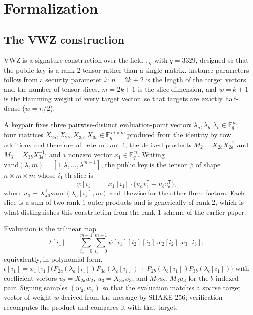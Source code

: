\section{Formalization}
\label{sec:formalization}

\subsection{The VWZ construction}

VWZ is a signature construction over the field $\mathbb{F}_q$ with $q = 3329$,
designed so that the public key is a rank-2 tensor rather than a single matrix.
Instance parameters follow from a security parameter $k$: $n = 2k+2$ is the
length of the target vectors and the number of tensor slices, $m = 2k+1$ is the
slice dimension, and $w = k+1$ is the Hamming weight of every target vector, so
that targets are exactly half-dense ($w = n/2$).

A keypair fixes three pairwise-distinct evaluation-point vectors
$\lambda_a, \lambda_b, \lambda_c \in \mathbb{F}_q^{\,n}$; four matrices
$X_{2a}, X_{2b}, X_{3a}, X_{3b} \in \mathbb{F}_q^{\,m \times m}$ produced from the
identity by row additions and therefore of determinant $1$; the derived products
$M_2 = X_{2b} X_{2a}^{-1}$ and $M_3 = X_{3b} X_{3a}^{-1}$; and a nonzero vector
$x_1 \in \mathbb{F}_q^{\,n}$. Writing $\mathrm{vand}(\lambda, m) =
[1, \lambda, \dots, \lambda^{m-1}]$, the public key is the tensor $\psi$ of shape
$n \times m \times m$ whose $i_1$-th slice is
\[
  \psi[i_1] \;=\; x_1[i_1] \cdot \bigl( u_a v_a^{\mathsf{T}} + u_b v_b^{\mathsf{T}} \bigr),
\]
where $u_a = X_{2a}^{\mathsf{T}} \mathrm{vand}(\lambda_a[i_1], m)$ and likewise
for the other three factors. Each slice is a sum of two rank-1 outer products
and is generically of rank 2, which is what distinguishes this construction from
the rank-1 scheme of the earlier paper.

Evaluation is the trilinear map
\[
  t[i_1] \;=\; \sum_{i_2=0}^{m-1} \sum_{i_3=0}^{m-1}
               \psi[i_1][i_2][i_3]\, w_2[i_2]\, w_3[i_3],
\]
equivalently, in polynomial form, $t[i_1] = x_1[i_1]\bigl( P_{2a}(\lambda_a[i_1])
P_{3a}(\lambda_c[i_1]) + P_{2b}(\lambda_b[i_1]) P_{3b}(\lambda_c[i_1]) \bigr)$
with coefficient vectors $u_2 = X_{2a} w_2$, $u_3 = X_{3a} w_3$, and
$M_2 u_2$, $M_3 u_3$ for the $b$-indexed pair. Signing samples $(w_2, w_3)$ so
that the evaluation matches a sparse target vector of weight $w$ derived from
the message by SHAKE-256; verification recomputes the product and compares it
with that target.

